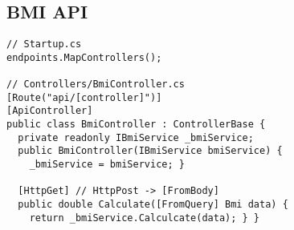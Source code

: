 \subsection{BMI API}
\begin{lstlisting}[style=csh]
// Startup.cs
endpoints.MapControllers();

// Controllers/BmiController.cs
[Route("api/[controller]")]
[ApiController]
public class BmiController : ControllerBase {
  private readonly IBmiService _bmiService;
  public BmiController(IBmiService bmiService) {
    _bmiService = bmiService; }

  [HttpGet] // HttpPost -> [FromBody]
  public double Calculate([FromQuery] Bmi data) {
    return _bmiService.Calculcate(data); } }
\end{lstlisting}
